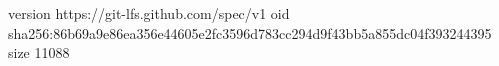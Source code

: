 version https://git-lfs.github.com/spec/v1
oid sha256:86b69a9e86ea356e44605e2fc3596d783cc294d9f43bb5a855dc04f393244395
size 11088
